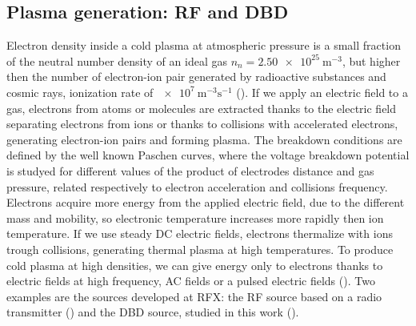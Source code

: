 \subsection{Plasma generation: RF and DBD}
Electron density inside a cold plasma at atmospheric pressure is a small fraction of the neutral number density of an ideal gas $n_{n} = \SI{2.50e25}{\meter^{-3}}$, but higher then the number of electron-ion pair generated by radioactive substances and cosmic rays, ionization rate of $\SI{e7}{\meter^{-3}\second^{-1}}$ (\cite{book:1593058}).
If we apply an electric field to a gas, electrons from atoms or molecules are extracted thanks to the electric field separating electrons from ions or thanks to collisions with accelerated electrons, generating electron-ion pairs and forming plasma. The breakdown conditions are defined by the well known Paschen curves, where the voltage breakdown potential is studyed for different values of the product of electrodes distance and gas pressure, related respectively to electron acceleration and collisions frequency.
Electrons acquire more energy from the applied electric field, due to the different mass and mobility, so electronic temperature increases more rapidly then ion temperature. If we use steady DC electric fields, electrons thermalize with ions trough collisions, generating thermal plasma at high temperatures. To produce cold plasma at high densities, we can give energy only to electrons thanks to electric fields at high frequency, AC fields or a pulsed electric fields (\cite{BARDOS20106705}).
Two examples are the sources developed at RFX: the RF source based on a radio transmitter (\cite{Martines_2009}) and the DBD source, studied in this work (\cite{DeMasi_2018}).

